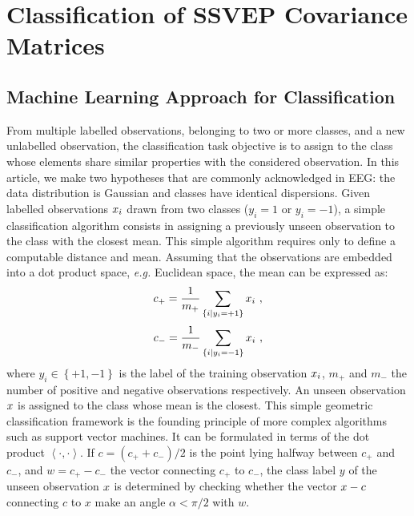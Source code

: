 \section{Classification of SSVEP Covariance Matrices}
\label{sec:classification-covmat}
\subsection{Machine Learning Approach for Classification}
\label{subsec:fund_class}

From multiple labelled observations, belonging to two or more classes, and a new unlabelled observation, the classification task objective is to assign to the class whose elements share similar properties with the considered observation.
In this article, we make two hypotheses that are commonly acknowledged in EEG: the data distribution is Gaussian and classes have identical dispersions.
Given labelled observations $x_i$ drawn from two classes ($y_i = 1$ or $y_i=-1$), a simple classification algorithm consists in assigning a previously unseen observation to the class with the closest mean.
This simple algorithm requires only to define a computable distance and mean. %
Assuming that the observations are embedded into a dot product space, \textit{e.g.} Euclidean space, the mean can be expressed as:
\begin{equation}
c_{+} = \frac{1}{m_{+}} \sum_{ \left\lbrace i|y_i=+1 \right\rbrace } \x_i \ ,
\label{eq:mean_eucl1}
\end{equation}
\begin{equation}
c_{-} = \frac{1}{m_{-}} \sum_{ \left\lbrace i|y_i=-1 \right\rbrace } \x_i \ ,
\label{eq:mean_eucl2}
\end{equation}
where $y_i \in \left\lbrace +1, -1 \right\rbrace$ is the label of the training observation $x_i$, $m_{+}$ and $m_{-}$ the number of positive and negative observations respectively. 
An unseen observation $x$ is assigned to the class whose mean is the closest. 
This simple geometric classification framework is the founding principle of more complex algorithms such as support vector machines. 
It can be formulated in terms of the dot product $\left\langle \cdot, \cdot \right\rangle$.
If $c=(c_{+}+c_{-})/2$ is the point lying halfway between $c_{+}$ and $c_{-}$, and $w=c_{+}-c_{-}$ the vector connecting $c_{+}$ to $c_{-}$, the class label $y$ of the unseen observation $x$ is determined by checking whether the vector $x-c$ connecting $c$ to $x$ make an angle $\alpha < \pi/2$ with $w$.   

